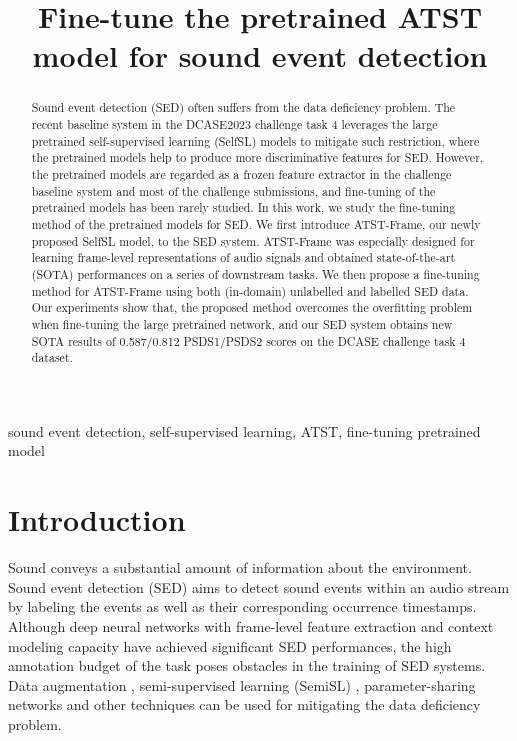 \documentclass{article}
\title{Fine-tune the pretrained ATST model for sound event detection}
\begin{document}
\ninept
\maketitle
\begin{abstract}
Sound event detection (SED) often suffers from the data deficiency problem. The recent baseline system in the DCASE2023 challenge task 4 leverages the large pretrained self-supervised learning (SelfSL) models to mitigate such restriction, where the pretrained models help to produce more discriminative features for SED. However, the pretrained models are regarded as a frozen feature extractor in the challenge baseline system and most of the challenge submissions, and fine-tuning of the pretrained models has been rarely studied.  
In this work, we study the fine-tuning method of the pretrained models for SED. We first introduce ATST-Frame, our newly proposed SelfSL model, to the SED system. ATST-Frame was especially designed for learning frame-level representations of audio signals and obtained state-of-the-art (SOTA) performances on a series of downstream tasks. We then propose a fine-tuning method for ATST-Frame using both (in-domain) unlabelled and labelled SED data. Our experiments show that, the proposed method overcomes the overfitting problem when fine-tuning the large pretrained network, and our SED system obtains new SOTA results of 0.587/0.812 PSDS1/PSDS2 scores on the DCASE challenge task 4 dataset.
\end{abstract}
\begin{keywords}
sound event detection, self-supervised learning, ATST, fine-tuning pretrained model 
\end{keywords}
\section{Introduction}
\label{sec:intro}
Sound conveys a substantial amount of information about the environment. Sound event detection (SED) aims to detect sound events within an audio stream by labeling the events as well as their corresponding occurrence timestamps. Although deep neural networks with frame-level feature extraction and context modeling capacity have achieved significant SED performances, the high annotation budget of the task poses obstacles in the training of SED systems. Data augmentation \cite{park2019specaugment, nam2022filteraugment,zhang2017mixup}, semi-supervised learning (SemiSL) \cite{tarvainen2017mean, verma2019interpolation,koh2021sound, shao22rct},  parameter-sharing networks \cite{jiakai2018mean, zheng21skcrnn, nam22fdy} and other techniques can be used for mitigating the data deficiency problem.
\end{document}
